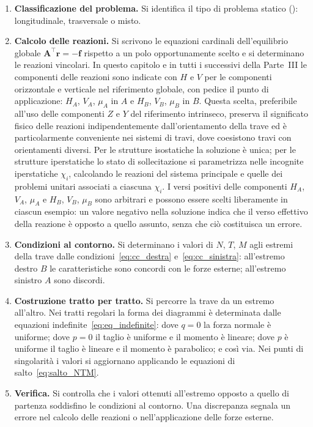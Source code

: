 \begin{enumerate}[nosep]
	\item \textbf{Classificazione del problema.}
	Si identifica il tipo di problema statico
	(): longitudinale,
	trasversale o misto.
	
	\item \textbf{Calcolo delle reazioni.}
	Si scrivono le equazioni cardinali dell'equilibrio	globale $\bm{A}^\top \bm{r} = -\bm{f}$ rispetto	a un polo opportunamente scelto e si determinano le reazioni vincolari. In questo capitolo e in tutti i successivi della	Parte~III le componenti delle reazioni sono	indicate con $H$ e $V$ per le componenti	orizzontale e verticale nel riferimento globale,  con pedice il punto di applicazione: 	$H_A$, $V_A$, $\mu_A$ in $A$ e $H_B$, $V_B$,	$\mu_B$ in $B$. Questa scelta, preferibile	all'uso delle componenti $Z$ e $Y$ del	riferimento intrinseco, preserva il significato	fisico delle reazioni indipendentemente	dall'orientamento della trave ed è particolarmente	conveniente nei sistemi di travi, dove	coesistono travi con orientamenti diversi.	Per le strutture isostatiche la soluzione è	unica; per le strutture iperstatiche lo stato di sollecitazione si parametrizza nelle	incognite iperstatiche $\chi_i$, calcolando	le reazioni del sistema principale e quelle	dei problemi unitari associati a ciascuna	$\chi_i$. I versi positivi delle componenti	$H_A$, $V_A$, $\mu_A$ e $H_B$, $V_B$, $\mu_B$ sono arbitrari e possono	essere scelti liberamente in ciascun esempio:	un valore negativo nella soluzione indica che il verso effettivo della reazione è opposto a quello assunto, senza che ciò costituisca un errore.
	
	\item \textbf{Condizioni al contorno.}
	Si determinano i valori di $N$, $T$, $M$ agli
	estremi della trave dalle
	condizioni~\eqref{eq:cc_destra}
	e~\eqref{eq:cc_sinistra}: all'estremo destro
	$B$ le caratteristiche sono concordi con le
	forze esterne; all'estremo sinistro $A$ sono
	discordi.
	
	\item \textbf{Costruzione tratto per tratto.}
	Si percorre la trave da un estremo all'altro.
	Nei tratti regolari la forma dei diagrammi è
	determinata dalle equazioni
	indefinite~\eqref{eq:eq_indefinite}: dove
	$q = 0$ la forza normale è uniforme; dove
	$p = 0$ il taglio è uniforme e il momento
	è lineare; dove $p$ è uniforme il taglio è
	lineare e il momento è parabolico; e così via.
	Nei punti di singolarità i valori si aggiornano
	applicando le equazioni di
	salto~\eqref{eq:salto_NTM}.
	
	\item \textbf{Verifica.}
	Si controlla che i valori ottenuti all'estremo
	opposto a quello di partenza soddisfino le
	condizioni al contorno. Una discrepanza segnala
	un errore nel calcolo delle reazioni o
	nell'applicazione delle forze esterne.
\end{enumerate}

